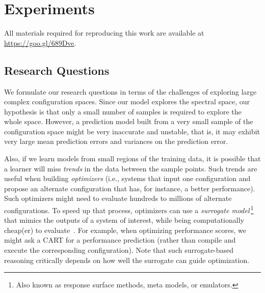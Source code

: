 \documentclass{newsig}
\begin{document}
\section{Experiments}
\label{sec:experiments}
All materials required for reproducing this work are available at \url{https://goo.gl/689Dve}.


\subsection{Research Questions} 

We formulate our research questions in terms of the challenges of
exploring large complex configuration spaces.
Since our model explores the spectral space, our hypothesis is that only a small
number of samples is required to explore the whole space.
However, a prediction model built from a very small sample of the configuration space might
be very inaccurate and unstable, that is, it may exhibit very large mean prediction errors and variances on the prediction error.

Also, if we learn models from small regions of the training data,
it is  possible that a learner will miss {\em trends} in the data
between the sample points. Such trends are useful when building {\em optimizers}
(i.e., systems that input one configuration and propose an alternate
configuration that has, for instance,  a better performance). Such optimizers might
need to evaluate hundreds to millions of alternate configurations. 
To speed up that process, optimizers can use a {\em surrogate model}\,\footnote{Also known as response surface methods, meta models, or emulators.}
that  mimics the outputs of a system of interest, while being computationally cheap(er) to evaluate~\cite{loshchilov13}. For example, when optimizing
performance scores, we might ask a CART  for a performance
prediction (rather than compile and execute
the corresponding configuration).  Note that such surrogate-based
reasoning critically depends on how well the surrogate can guide optimization.
\end{document}
